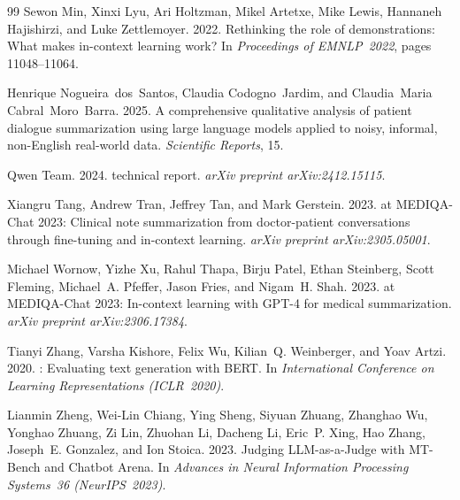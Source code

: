 \documentclass[10pt,twocolumn]{article}
\begin{document}
\begin{thebibliography}{99}
Sewon Min, Xinxi Lyu, Ari Holtzman, Mikel Artetxe, Mike Lewis, Hannaneh
  Hajishirzi, and Luke Zettlemoyer. 2022.
\newblock Rethinking the role of demonstrations: What makes in-context
  learning work?
\newblock In \textit{Proceedings of EMNLP~2022}, pages 11048--11064.

Henrique Nogueira~dos~Santos, Claudia Codogno~Jardim, and Claudia~Maria
  Cabral~Moro~Barra. 2025.
\newblock A comprehensive qualitative analysis of patient dialogue
  summarization using large language models applied to noisy, informal,
  non-{English} real-world data.
\newblock \textit{Scientific Reports}, 15.

Qwen Team. 2024.
 technical report.
\newblock \textit{arXiv preprint arXiv:2412.15115}.

Xiangru Tang, Andrew Tran, Jeffrey Tan, and Mark Gerstein. 2023.
 at {MEDIQA-Chat} 2023: Clinical note summarization
  from doctor-patient conversations through fine-tuning and in-context
  learning.
\newblock \textit{arXiv preprint arXiv:2305.05001}.

Michael Wornow, Yizhe Xu, Rahul Thapa, Birju Patel, Ethan Steinberg, Scott
  Fleming, Michael~A. Pfeffer, Jason Fries, and Nigam~H. Shah. 2023.
 at {MEDIQA-Chat} 2023: In-context learning with {GPT-4}
  for medical summarization.
\newblock \textit{arXiv preprint arXiv:2306.17384}.

Tianyi Zhang, Varsha Kishore, Felix Wu, Kilian~Q. Weinberger, and Yoav
  Artzi. 2020.
: Evaluating text generation with {BERT}.
\newblock In \textit{International Conference on Learning Representations
  (ICLR~2020)}.

Lianmin Zheng, Wei-Lin Chiang, Ying Sheng, Siyuan Zhuang, Zhanghao Wu,
  Yonghao Zhuang, Zi Lin, Zhuohan Li, Dacheng Li, Eric~P. Xing, Hao Zhang,
  Joseph~E. Gonzalez, and Ion Stoica. 2023.
\newblock Judging {LLM-as-a-Judge} with {MT-Bench} and Chatbot Arena.
\newblock In \textit{Advances in Neural Information Processing Systems~36
  (NeurIPS~2023)}.

\end{thebibliography}
\end{document}
